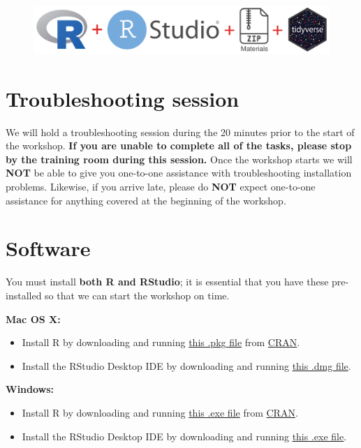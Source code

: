 \documentclass[]{book}
\providecommand{\tightlist}{%
  \setlength{\itemsep}{0pt}\setlength{\parskip}{0pt}}
\begin{document}
\begin{figure}
\centering
\includegraphics{R/Rinstall/images/install_software_R.png}
\caption{}
\end{figure}

\section{Troubleshooting session}\label{troubleshooting-session}

We will hold a troubleshooting session during the 20 minutes prior to
the start of the workshop. \textbf{If you are unable to complete all of
the tasks, please stop by the training room during this session.} Once
the workshop starts we will \textbf{NOT} be able to give you one-to-one
assistance with troubleshooting installation problems. Likewise, if you
arrive late, please do \textbf{NOT} expect one-to-one assistance for
anything covered at the beginning of the workshop.

\section{Software}\label{software}

You must install \textbf{both R and RStudio}; it is essential that you
have these pre-installed so that we can start the workshop on time.

\textbf{Mac OS X:}

\begin{itemize}
\tightlist
\item
  Install R by downloading and running
  \href{http://cran.r-project.org/bin/macosx/R-latest.pkg}{this .pkg
  file} from \href{http://cran.r-project.org/index.html}{CRAN}.
\item
  Install the RStudio Desktop IDE by downloading and running
  \href{https://download1.rstudio.org/desktop/macos/RStudio-1.2.5033.dmg}{this
  .dmg file}.
\end{itemize}

\textbf{Windows:}

\begin{itemize}
\tightlist
\item
  Install R by downloading and running
  \href{https://cran.r-project.org/bin/windows/base/release.htm}{this
  .exe file} from \href{http://cran.r-project.org/index.html}{CRAN}.
\item
  Install the RStudio Desktop IDE by downloading and running
  \href{https://download1.rstudio.org/desktop/windows/RStudio-1.2.5033.exe}{this
  .exe file}.
\end{itemize}
\end{document}

